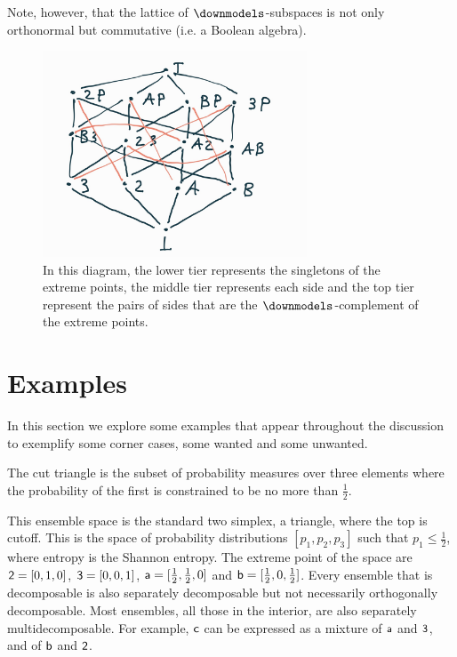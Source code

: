 Note, however, that the lattice of $\separate$-subspaces is not only orthonormal but commutative (i.e. a Boolean algebra).

\begin{figure}[h]
	\centering
	\includegraphics[width=0.7\textwidth]{tempimages/CutTriangleSubspaces2.jpg}
	\caption{In this diagram, the lower tier represents the singletons of the extreme points, the middle tier represents each side and the top tier represent the pairs of sides that are the $\separate$-complement of the extreme points.}
\end{figure}



\section{Examples}

In this section we explore some examples that appear throughout the discussion to exemplify some corner cases, some wanted and some unwanted.

\begin{example}\label{pm_es_cutTriangle}
	The cut triangle is the subset of probability measures over three elements where the probability of the first is constrained to be no more than $\frac{1}{2}$.
\end{example}

This ensemble space is the standard two simplex, a triangle, where the top is cutoff. This is the space of probability distributions $[p_1, p_2, p_3]$ such that $p_1 \leq \frac{1}{2}$, where entropy is the Shannon entropy. The extreme point of the space are $\ens[2] = [0,1,0]$, $\ens[3] = [0,0,1]$, $\ens[a] = [\frac{1}{2},\frac{1}{2},0]$ and $\ens[b] = [\frac{1}{2},0,\frac{1}{2}]$. Every ensemble that is decomposable is also separately decomposable but not necessarily orthogonally decomposable. Most ensembles, all those in the interior, are also separately multidecomposable. For example, $\ens[c]$ can be expressed as a mixture of $\ens[a]$ and $\ens[3]$, and of $\ens[b]$ and $\ens[2]$.


